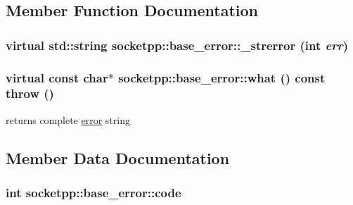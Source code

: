 \subsection{Member Function Documentation}
\hypertarget{classsocketpp_1_1base__error_2ed9790fc343de92333ab1f0239ffb5f}{
\subsubsection[{\_\-strerror}]{\setlength{\rightskip}{0pt plus 5cm}virtual std::string socketpp::base\_\-error::\_\-strerror (int {\em err})}}
\label{classsocketpp_1_1base__error_2ed9790fc343de92333ab1f0239ffb5f}


\hypertarget{classsocketpp_1_1base__error_a25ad5c1a163784dc72317790ea9c499}{
\subsubsection[{what}]{\setlength{\rightskip}{0pt plus 5cm}virtual const char$\ast$ socketpp::base\_\-error::what () const  throw ()}}
\label{classsocketpp_1_1base__error_a25ad5c1a163784dc72317790ea9c499}


returns complete \hyperlink{classsocketpp_1_1error}{error} string 



\subsection{Member Data Documentation}
\hypertarget{classsocketpp_1_1base__error_131ddb6f4303ff562b49a6ff2b7f7328}{
\subsubsection[{code}]{\setlength{\rightskip}{0pt plus 5cm}int {\bf socketpp::base\_\-error::code}}}
\label{classsocketpp_1_1base__error_131ddb6f4303ff562b49a6ff2b7f7328}


